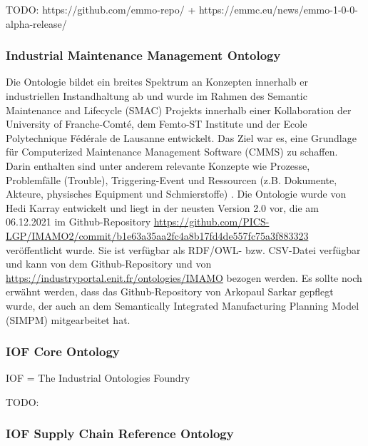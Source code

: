 \documentclass{article}
\begin{document}
TODO: https://github.com/emmo-repo/ + https://emmc.eu/news/emmo-1-0-0-alpha-release/

\subsubsection{Industrial Maintenance Management Ontology}

Die Ontologie bildet ein breites Spektrum an Konzepten innerhalb er industriellen Instandhaltung ab und wurde im Rahmen des Semantic Maintenance and Lifecycle (SMAC) Projekts innerhalb einer Kollaboration der University of Franche-Comté, dem Femto-ST Institute und der Ecole Polytechnique Fédérale de Lausanne entwickelt.
Das Ziel war es, eine Grundlage für Computerized Maintenance Management Software (CMMS) zu schaffen.
Darin enthalten sind unter anderem relevante Konzepte wie Prozesse, Problemfälle (Trouble), Triggering-Event und Ressourcen (z.B. Dokumente, Akteure, physisches Equipment und Schmierstoffe) \cite{karray2012formal}.
Die Ontologie wurde von Hedi Karray entwickelt und liegt in der neusten Version 2.0 vor, die am 06.12.2021 im Github-Repository \url{https://github.com/PICS-LGP/IMAMO2/commit/b1e63a35aa2fc4a8b17fd4de557fc75a3f883323} veröffentlicht wurde. 
Sie ist verfügbar als RDF/OWL- bzw. CSV-Datei verfügbar und kann von dem Github-Repository und von \url{https://industryportal.enit.fr/ontologies/IMAMO} bezogen werden.
Es sollte noch erwähnt werden, dass das Github-Repository von Arkopaul Sarkar gepflegt wurde, der auch an dem Semantically Integrated Manufacturing Planning Model (SIMPM) mitgearbeitet hat.

\subsubsection{IOF Core Ontology}

IOF = The Industrial Ontologies Foundry

TODO: \cite{kulvatunyou2022}

\subsubsection{IOF Supply Chain Reference Ontology}
\end{document}
